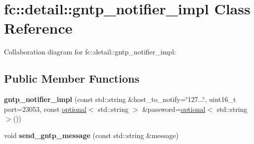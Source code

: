 \hypertarget{classfc_1_1detail_1_1gntp__notifier__impl}{}\section{fc\+:\+:detail\+:\+:gntp\+\_\+notifier\+\_\+impl Class Reference}
\label{classfc_1_1detail_1_1gntp__notifier__impl}


Collaboration diagram for fc\+:\+:detail\+:\+:gntp\+\_\+notifier\+\_\+impl\+:
\subsection*{Public Member Functions}
\begin{DoxyCompactItemize}
\item 
\mbox{\label{classfc_1_1detail_1_1gntp__notifier__impl_afd28263fab72d130dbe05e5338004e58}} 
{\bfseries gntp\+\_\+notifier\+\_\+impl} (const std\+::string \&host\+\_\+to\+\_\+notify=\char`\"{}127...\char`\"{}, uint16\+\_\+t port=23053, const \mbox{\hyperlink{classfc_1_1optional}{optional}}$<$ std\+::string $>$ \&password=\mbox{\hyperlink{classfc_1_1optional}{optional}}$<$ std\+::string $>$())
\item 
\mbox{\label{classfc_1_1detail_1_1gntp__notifier__impl_acbf0038b3e167f072237cd201c4fcbcf}} 
void {\bfseries send\+\_\+gntp\+\_\+message} (const std\+::string \&message)
\end{DoxyCompactItemize}
